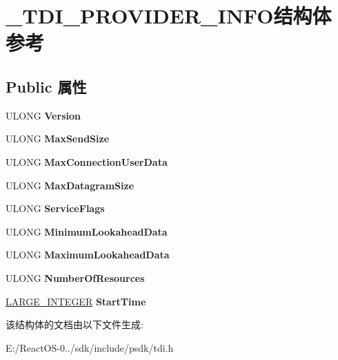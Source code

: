 \hypertarget{struct___t_d_i___p_r_o_v_i_d_e_r___i_n_f_o}{}\section{\+\_\+\+T\+D\+I\+\_\+\+P\+R\+O\+V\+I\+D\+E\+R\+\_\+\+I\+N\+F\+O结构体 参考}
\label{struct___t_d_i___p_r_o_v_i_d_e_r___i_n_f_o}
\subsection*{Public 属性}
\begin{DoxyCompactItemize}
\item 
\mbox{\label{struct___t_d_i___p_r_o_v_i_d_e_r___i_n_f_o_a96ed2b0102c56899f723b42909d2e86d}} 
U\+L\+O\+NG {\bfseries Version}
\item 
\mbox{\label{struct___t_d_i___p_r_o_v_i_d_e_r___i_n_f_o_a0f574b7df4d1a75a6156a9376888ab41}} 
U\+L\+O\+NG {\bfseries Max\+Send\+Size}
\item 
\mbox{\label{struct___t_d_i___p_r_o_v_i_d_e_r___i_n_f_o_a075950f9909cd1988f990a1a826304bd}} 
U\+L\+O\+NG {\bfseries Max\+Connection\+User\+Data}
\item 
\mbox{\label{struct___t_d_i___p_r_o_v_i_d_e_r___i_n_f_o_a40aa982d7d5b2cf1d65647464e5c4cfc}} 
U\+L\+O\+NG {\bfseries Max\+Datagram\+Size}
\item 
\mbox{\label{struct___t_d_i___p_r_o_v_i_d_e_r___i_n_f_o_a735f173c595583f4b6b990ba359490c2}} 
U\+L\+O\+NG {\bfseries Service\+Flags}
\item 
\mbox{\label{struct___t_d_i___p_r_o_v_i_d_e_r___i_n_f_o_ad05eac39be7e5a91964c16afb9b58dcb}} 
U\+L\+O\+NG {\bfseries Minimum\+Lookahead\+Data}
\item 
\mbox{\label{struct___t_d_i___p_r_o_v_i_d_e_r___i_n_f_o_a81620ee135dc78725c4e2da099026605}} 
U\+L\+O\+NG {\bfseries Maximum\+Lookahead\+Data}
\item 
\mbox{\label{struct___t_d_i___p_r_o_v_i_d_e_r___i_n_f_o_aaf74261c9eec54501a5aa7ed3d89d156}} 
U\+L\+O\+NG {\bfseries Number\+Of\+Resources}
\item 
\mbox{\label{struct___t_d_i___p_r_o_v_i_d_e_r___i_n_f_o_a45d057ba3a00295cd49deab63a48f739}} 
\hyperlink{union___l_a_r_g_e___i_n_t_e_g_e_r}{L\+A\+R\+G\+E\+\_\+\+I\+N\+T\+E\+G\+ER} {\bfseries Start\+Time}
\end{DoxyCompactItemize}


该结构体的文档由以下文件生成\+:\begin{DoxyCompactItemize}
\item 
E\+:/\+React\+O\+S-\/0../sdk/include/psdk/tdi.\+h\end{DoxyCompactItemize}
